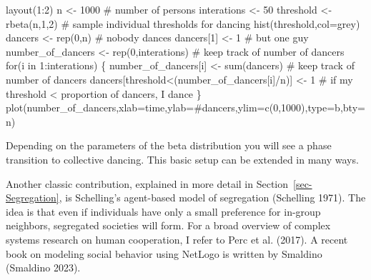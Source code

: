 \documentclass[
  a4paper,
  DIV=11,
  numbers=noendperiod,
  oneside]{scrreprt}
\newenvironment{Shaded}{\begin{snugshade}}{\end{snugshade}}
\newcommand{\AttributeTok}[1]{\textcolor[rgb]{0.40,0.45,0.13}{#1}}
\newcommand{\CommentTok}[1]{\textcolor[rgb]{0.37,0.37,0.37}{#1}}
\newcommand{\ControlFlowTok}[1]{\textcolor[rgb]{0.00,0.23,0.31}{#1}}
\newcommand{\DecValTok}[1]{\textcolor[rgb]{0.68,0.00,0.00}{#1}}
\newcommand{\FunctionTok}[1]{\textcolor[rgb]{0.28,0.35,0.67}{#1}}
\newcommand{\NormalTok}[1]{\textcolor[rgb]{0.00,0.23,0.31}{#1}}
\newcommand{\OtherTok}[1]{\textcolor[rgb]{0.00,0.23,0.31}{#1}}
\newcommand{\SpecialCharTok}[1]{\textcolor[rgb]{0.37,0.37,0.37}{#1}}
\newcommand{\StringTok}[1]{\textcolor[rgb]{0.13,0.47,0.30}{#1}}
\begin{document}
\begin{Shaded}
\begin{Highlighting}[]
\FunctionTok{layout}\NormalTok{(}\DecValTok{1}\SpecialCharTok{:}\DecValTok{2}\NormalTok{)}
\NormalTok{n }\OtherTok{\textless{}{-}} \DecValTok{1000} \CommentTok{\# number of persons}
\NormalTok{interations }\OtherTok{\textless{}{-}} \DecValTok{50}
\NormalTok{threshold }\OtherTok{\textless{}{-}} \FunctionTok{rbeta}\NormalTok{(n,}\DecValTok{1}\NormalTok{,}\DecValTok{2}\NormalTok{) }\CommentTok{\# sample individual thresholds for dancing}
\FunctionTok{hist}\NormalTok{(threshold,}\AttributeTok{col=}\StringTok{\textquotesingle{}grey\textquotesingle{}}\NormalTok{)}
\NormalTok{dancers }\OtherTok{\textless{}{-}} \FunctionTok{rep}\NormalTok{(}\DecValTok{0}\NormalTok{,n) }\CommentTok{\# nobody dances}
\NormalTok{dancers[}\DecValTok{1}\NormalTok{] }\OtherTok{\textless{}{-}} \DecValTok{1} \CommentTok{\# but one guy}
\NormalTok{number\_of\_dancers }\OtherTok{\textless{}{-}} \FunctionTok{rep}\NormalTok{(}\DecValTok{0}\NormalTok{,interations) }\CommentTok{\# keep track of number of dancers}
\ControlFlowTok{for}\NormalTok{(i }\ControlFlowTok{in} \DecValTok{1}\SpecialCharTok{:}\NormalTok{interations)}
\NormalTok{\{}
\NormalTok{  number\_of\_dancers[i] }\OtherTok{\textless{}{-}} \FunctionTok{sum}\NormalTok{(dancers) }\CommentTok{\# keep track of number of dancers}
\NormalTok{  dancers[threshold}\SpecialCharTok{\textless{}}\NormalTok{(number\_of\_dancers[i]}\SpecialCharTok{/}\NormalTok{n)] }\OtherTok{\textless{}{-}} \DecValTok{1} 
\CommentTok{\# if my threshold \textless{} proportion of dancers, I dance}
\NormalTok{\}}
\FunctionTok{plot}\NormalTok{(number\_of\_dancers,}\AttributeTok{xlab=}\StringTok{\textquotesingle{}time\textquotesingle{}}\NormalTok{,}\AttributeTok{ylab=}\StringTok{\textquotesingle{}\#dancers\textquotesingle{}}\NormalTok{,}\AttributeTok{ylim=}\FunctionTok{c}\NormalTok{(}\DecValTok{0}\NormalTok{,}\DecValTok{1000}\NormalTok{),}\AttributeTok{type=}\StringTok{\textquotesingle{}b\textquotesingle{}}\NormalTok{,}\AttributeTok{bty=}\StringTok{\textquotesingle{}n\textquotesingle{}}\NormalTok{)}
\end{Highlighting}
\end{Shaded}

Depending on the parameters of the beta distribution you will see a
phase transition to collective dancing. This basic setup can be extended
in many ways.

Another classic contribution, explained in more detail in
Section~\ref{sec-Segregation}, is Schelling's agent-based model of
segregation (Schelling 1971). The idea is that even if individuals have
only a small preference for in-group neighbors, segregated societies
will form. For a broad overview of complex systems research on human
cooperation, I refer to Perc et al. (2017). A recent book on modeling
social behavior using NetLogo is written by Smaldino (Smaldino 2023).
\end{document}
